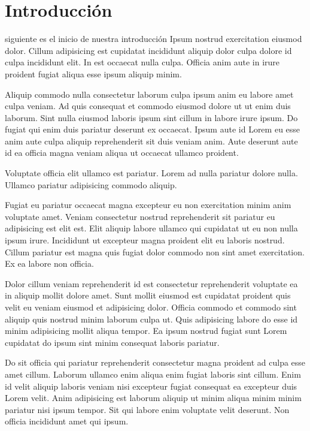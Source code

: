\section{Introducción}
 siguiente es el inicio de nuestra introducción
Ipsum nostrud exercitation eiusmod dolor. Cillum adipisicing est cupidatat incididunt aliquip dolor culpa dolore id culpa incididunt elit. In est occaecat nulla culpa. Officia anim aute in irure proident fugiat aliqua esse ipsum aliquip minim.

Aliquip commodo nulla consectetur laborum culpa ipsum anim eu labore amet culpa veniam. Ad quis consequat et commodo eiusmod dolore ut ut enim duis laborum. Sint nulla eiusmod laboris ipsum sint cillum in labore irure ipsum. Do fugiat qui enim duis pariatur deserunt ex occaecat. Ipsum aute id Lorem eu esse anim aute culpa aliquip reprehenderit sit duis veniam anim. Aute deserunt aute id ea officia magna veniam aliqua ut occaecat ullamco proident.

Voluptate officia elit ullamco est pariatur. Lorem ad nulla pariatur dolore nulla. Ullamco pariatur adipisicing commodo aliquip.

Fugiat eu pariatur occaecat magna excepteur eu non exercitation minim anim voluptate amet. Veniam consectetur nostrud reprehenderit sit pariatur eu adipisicing est elit est. Elit aliquip labore ullamco qui cupidatat ut eu non nulla ipsum irure. Incididunt ut excepteur magna proident elit eu laboris nostrud. Cillum pariatur est magna quis fugiat dolor commodo non sint amet exercitation. Ex ea labore non officia.

Dolor cillum veniam reprehenderit id est consectetur reprehenderit voluptate ea in aliquip mollit dolore amet. Sunt mollit eiusmod est cupidatat proident quis velit eu veniam eiusmod et adipisicing dolor. Officia commodo et commodo sint aliquip quis nostrud minim laborum culpa ut. Quis adipisicing labore do esse id minim adipisicing mollit aliqua tempor. Ea ipsum nostrud fugiat sunt Lorem cupidatat do ipsum sint minim consequat laboris pariatur.

Do sit officia qui pariatur reprehenderit consectetur magna proident ad culpa esse amet cillum. Laborum ullamco enim aliqua enim fugiat laboris sint cillum. Enim id velit aliquip laboris veniam nisi excepteur fugiat consequat ea excepteur duis Lorem velit. Anim adipisicing est laborum aliquip ut minim aliqua minim minim pariatur nisi ipsum tempor. Sit qui labore enim voluptate velit deserunt. Non officia incididunt amet qui ipsum.
